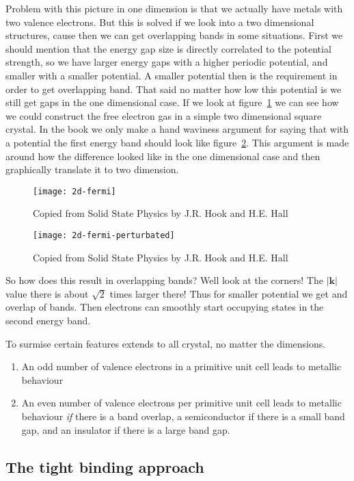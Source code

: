 \documentclass[11pt]{article}
\begin{document}
Problem with this picture in one dimension is that we actually have metals with two valence electrons. But this is solved if we look into a two dimensional structures, cause then we can get overlapping bands in some situations. First we should mention that the energy gap size is directly correlated to the potential strength, so we have larger energy gaps with a higher periodic potential, and smaller with a smaller potential. A smaller potential then is the requirement in order to get overlapping band. That said no matter how low this potential is we still get gaps in the one dimensional case. If we look at figure~\ref{fig:2d-fermi} we can see how we could construct the free electron gas in a simple two dimensional square crystal. In the book we only make a hand waviness argument for saying that with a potential the first energy band should look like figure~\ref{fig:2d-fermi-perturbated}. This argument is made around how the difference looked like in the one dimensional case and then graphically translate it to  two dimension. 
\begin{figure}[!ht]
	\centering
	\texttt{[image: 2d-fermi]}
	\caption{Copied from Solid State Physics by J.R. Hook and H.E. Hall}
	\label{fig:2d-fermi}
\end{figure}
\begin{figure}[!ht]
	\centering
	\texttt{[image: 2d-fermi-perturbated]}
	\caption{Copied from Solid State Physics by J.R. Hook and H.E. Hall}
	\label{fig:2d-fermi-perturbated}
\end{figure}
\newpage
So how does this result in overlapping bands? Well look at the corners! The $|\pmb{k}|$ value there is about $\sqrt{2}$ times larger there! Thus for smaller potential we get and overlap of bands. Then electrons can smoothly start occupying states in the second energy band.

To surmise certain features extends to all crystal, no matter the dimensions.
\begin{enumerate}
	\item An odd number of valence electrons in a primitive unit cell leads to metallic behaviour
	\item An even number of valence electrons per primitive unit cell leads to metallic behaviour \emph{if} there is a band overlap, a semiconductor if there is a small band gap, and an insulator if there is a large band gap.
\end{enumerate}

\subsection{The tight binding approach}
\end{document}
